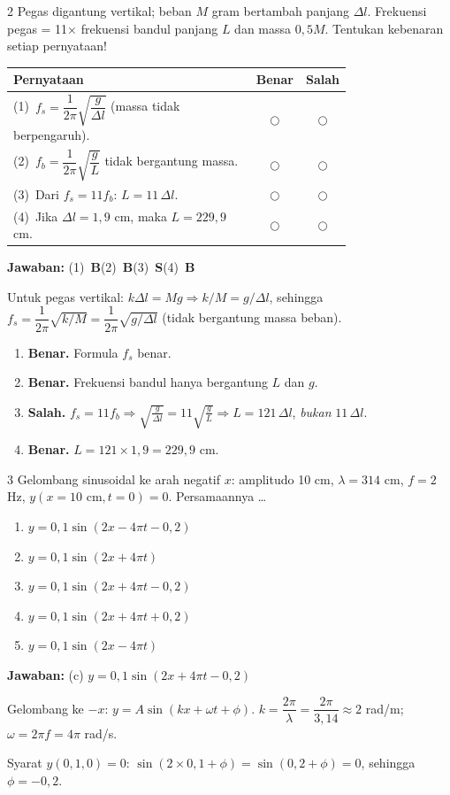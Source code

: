 \documentclass[11pt]{article}
\newcommand{\jawaban}[1]{%
  \noindent\colorbox{gold!30}{\parbox{\dimexpr\linewidth-2\fboxsep\relax}{%
    \textbf{Jawaban:} #1}}\par\smallskip}
\newenvironment{pil}{%
  \begin{enumerate}[label=(\alph*),leftmargin=*,itemsep=1pt,topsep=3pt]}%
  {\end{enumerate}}
\begin{document}
\begin{soal}{2}
Pegas digantung vertikal; beban $M$ gram bertambah panjang $\Delta l$.
Frekuensi pegas = 11× frekuensi bandul panjang $L$ dan massa $0{,}5M$.
Tentukan kebenaran setiap pernyataan!

\par\smallskip
{\renewcommand{\arraystretch}{1.4}%
\begin{tabular}{@{}p{0.76\linewidth}cc@{}}
\hline\textbf{Pernyataan}&\textbf{Benar}&\textbf{Salah}\\\hline
(1)~$f_s=\dfrac{1}{2\pi}\sqrt{\dfrac{g}{\Delta l}}$ (massa tidak berpengaruh).&$\bigcirc$&$\bigcirc$\\
(2)~$f_b=\dfrac{1}{2\pi}\sqrt{\dfrac{g}{L}}$ tidak bergantung massa.&$\bigcirc$&$\bigcirc$\\
(3)~Dari $f_s=11f_b$: $L=11\,\Delta l$.&$\bigcirc$&$\bigcirc$\\
(4)~Jika $\Delta l=1{,}9$ cm, maka $L=229{,}9$ cm.&$\bigcirc$&$\bigcirc$\\\hline
\end{tabular}}
\end{soal}
\begin{pembox}
\jawaban{(1)~\textbf{B}\quad(2)~\textbf{B}\quad(3)~\textbf{S}\quad(4)~\textbf{B}}
Untuk pegas vertikal: $k\Delta l=Mg\Rightarrow k/M=g/\Delta l$, sehingga
$f_s=\dfrac{1}{2\pi}\sqrt{k/M}=\dfrac{1}{2\pi}\sqrt{g/\Delta l}$
(tidak bergantung massa beban).
\begin{enumerate}[leftmargin=*,topsep=2pt,itemsep=2pt]
\item \textbf{Benar.} Formula $f_s$ benar.
\item \textbf{Benar.} Frekuensi bandul hanya bergantung $L$ dan $g$.
\item \textbf{Salah.} $f_s=11f_b\Rightarrow\sqrt{\tfrac{g}{\Delta l}}=11\sqrt{\tfrac{g}{L}}\Rightarrow L=121\,\Delta l$, \emph{bukan} $11\,\Delta l$.
\item \textbf{Benar.} $L=121\times1{,}9=229{,}9$ cm.
\end{enumerate}
\end{pembox}

\begin{soal}{3}
Gelombang sinusoidal ke arah negatif $x$: amplitudo 10 cm, $\lambda=314$ cm,
$f=2$ Hz, $y(x{=}10\text{ cm},t{=}0)=0$. Persamaannya \ldots
\begin{pil}
  \item $y=0{,}1\sin(2x-4\pi t-0{,}2)$
  \item $y=0{,}1\sin(2x+4\pi t)$
  \item $y=0{,}1\sin(2x+4\pi t-0{,}2)$
  \item $y=0{,}1\sin(2x+4\pi t+0{,}2)$
  \item $y=0{,}1\sin(2x-4\pi t)$
\end{pil}
\end{soal}
\begin{pembox}
\jawaban{(c) $y=0{,}1\sin(2x+4\pi t-0{,}2)$}
Gelombang ke $-x$: $y=A\sin(kx+\omega t+\phi)$.
$k=\dfrac{2\pi}{\lambda}=\dfrac{2\pi}{3{,}14}\approx2$ rad/m;\quad
$\omega=2\pi f=4\pi$ rad/s.

Syarat $y(0{,}1,0)=0$: $\sin(2\times0{,}1+\phi)=\sin(0{,}2+\phi)=0$,
sehingga $\phi=-0{,}2$.
\end{pembox}
\end{document}
